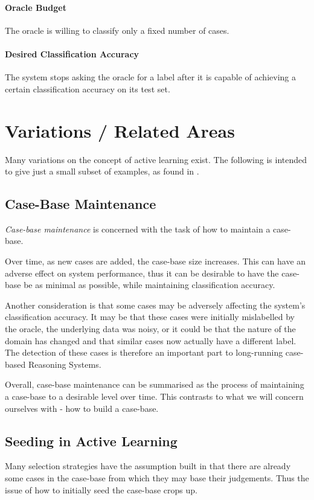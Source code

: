 \documentclass[a4paper,11pt]{report}
\begin{document}
\paragraph{Oracle Budget} 
The oracle is willing to classify only a fixed number of cases.

\paragraph{Desired Classification Accuracy} 
The system stops asking the oracle for a label after it is capable of achieving a certain classification accuracy on its test set.

\section{Variations / Related Areas}
Many variations on the concept of active learning exist. The following is intended to give just a small subset of examples, as found in \citet{Settles2010}.

\subsection{Case-Base Maintenance}
\emph{Case-base maintenance} is concerned with the task of how to maintain a case-base. 

Over time, as new cases are added, the case-base size increases. This can have an adverse effect on system performance, thus it can be desirable to have the case-base be as minimal as possible, while maintaining classification accuracy.

Another consideration is that some cases may be adversely affecting the system's classification accuracy. It may be that these cases were initially mislabelled by the oracle, the underlying data was noisy, or it could be that the nature of the domain has changed and that similar cases now actually have a different label. The detection of these cases is therefore an important part to long-running case-based Reasoning Systems.

Overall, case-base maintenance can be summarised as the process of maintaining a case-base to a desirable level over time. This contrasts to what we will concern ourselves with - how to build a case-base.

\subsection{Seeding in Active Learning}
Many selection strategies have the assumption built in that there are already some cases in the case-base from which they may base their judgements. Thus the issue of how to initially seed the case-base crops up.
\end{document}
